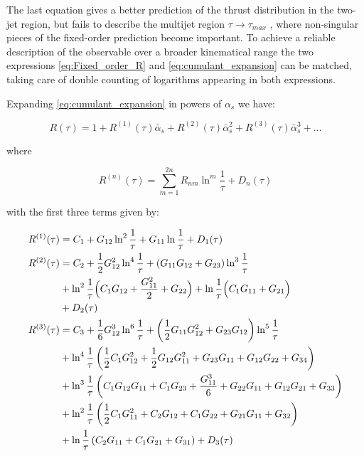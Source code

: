 \documentclass[../main.tex]{subfiles}
\begin{document}
The last equation gives a better prediction of the thrust distribution in the two-jet
region, but fails to describe the multijet region $\tau \to \tau_{max}$ , where non-singular pieces of the
fixed-order prediction become important. To achieve a reliable description of the observable
over a broader kinematical range the two expressions \cref{eq:Fixed_order_R} and \cref{eq:cumulant_expansion} can be matched,
taking care of double counting of logarithms appearing in both expressions.

Expanding \cref{eq:cumulant_expansion} in powers of $\alpha_s$ we have:

\begin{equation}
    R(\tau) = 1 + R^{(1)}(\tau) \bar{\alpha}_s + R^{(2)}(\tau)\bar{\alpha}_s^2 + R^{(3)}(\tau)\bar{\alpha}_s^3+ \dots
\end{equation}

where 

\begin{equation}
    R^{(n)}(\tau) = \sum_{m=1}^{2n} R_{nm} \ln^m \frac{1}{\tau} + D_n(\tau)
\end{equation}

with the first three terms given by:

\begin{equation}
    \begin{split}
        R^{(1)}(\tau) &= C_1  + G_{12} \ln ^2\frac{1}{\tau}+G_{11} \ln \frac{1}{\tau} + D_1(\tau)\\
        R^{(2)}(\tau) & = C_2 +\frac{1}{2} G_{12}^2 \ln ^4\frac{1}{\tau} +\left(G_{11} G_{12}+G_{23}\right) \ln ^3\frac{1}{\tau}\\
        &+\ln ^2\frac{1}{\tau} \Bigl(C_1 G_{12}+\frac{G_{11}^2}{2}+G_{22}\Bigr)+\ln \frac{1}{\tau} \Bigl(C_1 G_{11}+G_{21}\Bigr)\\
        &+ D_2(\tau)\\
        R^{(3)}(\tau) &= C_3 +\frac{1}{6} G_{12}^3 \ln ^6\frac{1}{\tau}+\left(\frac{1}{2} G_{11} G_{12}^2+G_{23} G_{12}\right) \ln ^5\frac{1}{\tau} \\
        &+ \ln ^4\frac{1}{\tau} \left(\frac{1}{2} C_1 G_{12}^2+\frac{1}{2} G_{12} G_{11}^2+G_{23} G_{11}+G_{12} G_{22}+G_{34}\right)\\
        &+\ln ^3\frac{1}{\tau} \left(C_1 G_{12} G_{11}+C_1 G_{23}+\frac{G_{11}^3}{6}+G_{22} G_{11}+G_{12} G_{21}+G_{33}\right)\\
        &+\ln ^2\frac{1}{\tau} \left(\frac{1}{2} C_1 G_{11}^2+C_2 G_{12}+C_1 G_{22}+G_{21} G_{11}+G_{32}\right)\\
        &+\ln \frac{1}{\tau} \left(C_2 G_{11}+C_1 G_{21}+G_{31}\right) + D_3(\tau)
    \end{split}
\end{equation}
\end{document}
